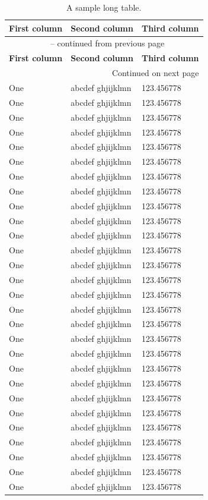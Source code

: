 \begin{longtable}{|l|l|l|}
    \caption{A sample long table.} 
    \label{tab:TableLong} \\
    
    \hline 
    \textbf{First column} & \textbf{Second column} & \textbf{Third column} \\ 
    \hline 
    \endfirsthead
    
    \multicolumn{3}{c}{{\tablename\ \thetable{} -- continued from previous page}} \\
    \hline 
    \textbf{First column} & \textbf{Second column} & \textbf{Third column} \\ 
    \hline 
    \endhead
    
    
    \hline \multicolumn{3}{|r|}{{Continued on next page}} \\ \hline
    \endfoot
    
    \hline \hline
    \endlastfoot

One & abcdef ghjijklmn & 123.456778 \\
One & abcdef ghjijklmn & 123.456778 \\
One & abcdef ghjijklmn & 123.456778 \\
One & abcdef ghjijklmn & 123.456778 \\
One & abcdef ghjijklmn & 123.456778 \\
One & abcdef ghjijklmn & 123.456778 \\
One & abcdef ghjijklmn & 123.456778 \\
One & abcdef ghjijklmn & 123.456778 \\
One & abcdef ghjijklmn & 123.456778 \\
One & abcdef ghjijklmn & 123.456778 \\
One & abcdef ghjijklmn & 123.456778 \\
One & abcdef ghjijklmn & 123.456778 \\
One & abcdef ghjijklmn & 123.456778 \\
One & abcdef ghjijklmn & 123.456778 \\
One & abcdef ghjijklmn & 123.456778 \\
One & abcdef ghjijklmn & 123.456778 \\
One & abcdef ghjijklmn & 123.456778 \\
One & abcdef ghjijklmn & 123.456778 \\
One & abcdef ghjijklmn & 123.456778 \\
One & abcdef ghjijklmn & 123.456778 \\
One & abcdef ghjijklmn & 123.456778 \\
One & abcdef ghjijklmn & 123.456778 \\
One & abcdef ghjijklmn & 123.456778 \\
One & abcdef ghjijklmn & 123.456778 \\
One & abcdef ghjijklmn & 123.456778 \\
One & abcdef ghjijklmn & 123.456778 \\
One & abcdef ghjijklmn & 123.456778 \\
One & abcdef ghjijklmn & 123.456778 \\
\end{longtable}





